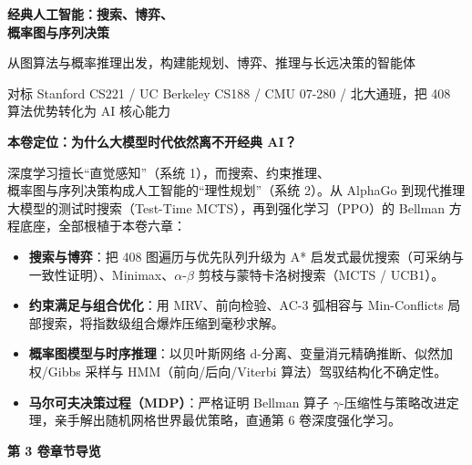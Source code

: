 \documentclass[UTF8,10.5pt,a4paper,oneside,fontset=fandol,scheme=plain]{ctexbook}
\begin{document}
{\fontsize{24}{32}\selectfont\sffamily\bfseries\color{ink}经典人工智能：搜索、博弈、\\概率图与序列决策}\par
\vspace{2.5mm}
{\large\sffamily\color{teal}从图算法与概率推理出发，构建能规划、博弈、推理与长远决策的智能体}\par
\vspace{4.5mm}
{\small\color{slate}对标 Stanford CS221 / UC Berkeley CS188 / CMU 07-280 / 北大通班，把 408 算法优势转化为 AI 核心能力}\par

\vspace{5.5mm}

\begin{tcolorbox}[
  enhanced,
  colback=tealLight,
  colframe=tealLine,
  borderline west={2.6pt}{0pt}{tealDark},
  arc=2mm,
  boxrule=0.5pt,
  left=4.5mm,right=4.5mm,top=3mm,bottom=3mm
]
\textbf{\sffamily\color{tealDark}本卷定位：为什么大模型时代依然离不开经典 AI？}\par\vspace{1.2mm}
\small
深度学习擅长“直觉感知”（系统 1），而搜索、约束推理、\\概率图与序列决策构成人工智能的“理性规划”（系统 2）。从 AlphaGo 到现代推理大模型的测试时搜索（Test-Time MCTS），再到强化学习（PPO）的 Bellman 方程底座，全部根植于本卷六章：
\begin{itemize}
  \item \textbf{搜索与博弈}：把 408 图遍历与优先队列升级为 A* 启发式最优搜索（可采纳与一致性证明）、Minimax、$\alpha$-$\beta$ 剪枝与蒙特卡洛树搜索（MCTS / UCB1）。
  \item \textbf{约束满足与组合优化}：用 MRV、前向检验、AC-3 弧相容与 Min-Conflicts 局部搜索，将指数级组合爆炸压缩到毫秒求解。
  \item \textbf{概率图模型与时序推理}：以贝叶斯网络 d-分离、变量消元精确推断、似然加权/Gibbs 采样与 HMM（前向/后向/Viterbi 算法）驾驭结构化不确定性。
  \item \textbf{马尔可夫决策过程（MDP）}：严格证明 Bellman 算子 $\gamma$-压缩性与策略改进定理，亲手解出随机网格世界最优策略，直通第 6 卷深度强化学习。
\end{itemize}
\end{tcolorbox}

\vspace{4.5mm}

\noindent\textbf{\sffamily\color{tealDark}第 3 卷章节导览}
\vspace{1.5mm}
\end{document}
